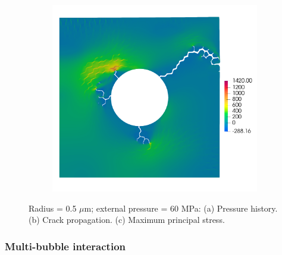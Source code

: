 \begin{figure}[htb!]
\begin{subfigure}[t]{0.32\linewidth}
    \caption{}
  \end{subfigure}
  \begin{subfigure}[t]{0.32\linewidth}
    \centering
    \includegraphics[width=\linewidth]{Chapter3/figures/r5_ext60_stress}
    \caption{}
  \end{subfigure}
  \caption{\label{fig:r5_60} Radius = 0.5 $\mu$m; external pressure = 60 MPa: (a) Pressure history. (b) Crack propagation. (c) Maximum principal stress.}
\end{figure}

\subsubsection{Multi-bubble interaction}

